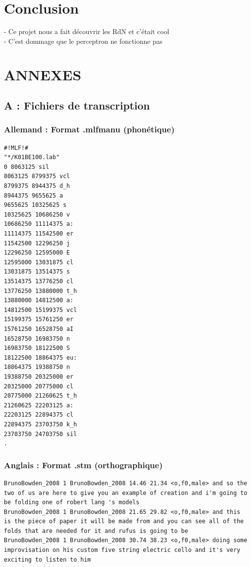 \documentclass{article}
\begin{document}
\section{Conclusion}

- Ce projet nous a fait découvrir les RdN et c'était cool\\
- C'est dommage que le perceptron ne fonctionne pas

\newpage




\newpage

\section*{ANNEXES}
\setcounter{page}{1}

\subsection*{A : Fichiers de transcription}
\subsubsection*{Allemand : Format .mlfmanu (phonétique)}

\begin{lstlisting}[basicstyle=\sffamily, columns=flexible]
#!MLF!#
"*/K01BE100.lab"
0 8063125 sil
8063125 8799375 vcl
8799375 8944375 d_h
8944375 9655625 a
9655625 10325625 s
10325625 10686250 v
10686250 11114375 a:
11114375 11542500 er
11542500 12296250 j
12296250 12595000 E
12595000 13031875 cl
13031875 13514375 s
13514375 13776250 cl
13776250 13880000 t_h
13880000 14812500 a:
14812500 15199375 vcl
15199375 15761250 er
15761250 16528750 aI
16528750 16983750 n
16983750 18122500 S
18122500 18864375 eu:
18864375 19388750 n
19388750 20325000 er
20325000 20775000 cl
20775000 21260625 t_h
21260625 22203125 a:
22203125 22894375 cl
22894375 23703750 k_h
23703750 24703750 sil
.
\end{lstlisting}

\subsubsection*{Anglais : Format .stm (orthographique)}

\begin{lstlisting}[breaklines=true,basicstyle=\sffamily, columns=flexible]
BrunoBowden_2008 1 BrunoBowden_2008 14.46 21.34 <o,f0,male> and so the two of us are here to give you an example of creation and i'm going to be folding one of robert lang 's models
BrunoBowden_2008 1 BrunoBowden_2008 21.65 29.82 <o,f0,male> and this is the piece of paper it will be made from and you can see all of the folds that are needed for it and rufus is going to be
BrunoBowden_2008 1 BrunoBowden_2008 30.74 38.23 <o,f0,male> doing some improvisation on his custom five string electric cello and it's very exciting to listen to him
\end{lstlisting}
\end{document}
